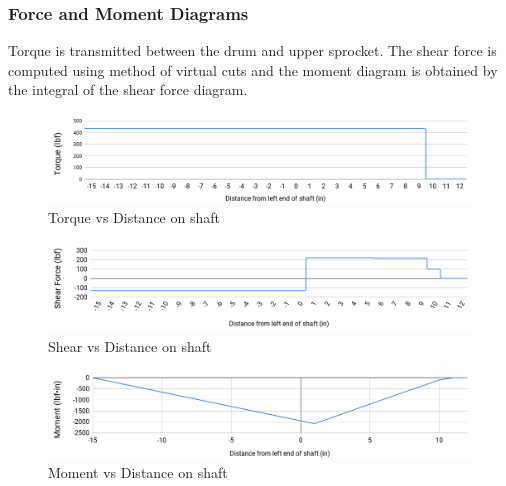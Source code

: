 \documentclass[letterpaper,12pt]{article}
\begin{document}
\subsubsection{Force and Moment Diagrams}
Torque is transmitted between the drum and upper sprocket. The shear force is computed using method of virtual cuts and the moment diagram is obtained by the integral of the shear force diagram. 


\begin{figure}[!h]
\centering
    \includegraphics[width=\linewidth]{A3/torque_wide.png}
    \caption{Torque vs Distance on shaft}
\end{figure}
\vspace{-5mm}
\begin{figure}[!h]
\centering
    \includegraphics[width=\linewidth]{A3/shear_wide.png}
    \caption{Shear vs Distance on shaft}
\end{figure}
\vspace{-5mm}
\begin{figure}[!h]
\centering
    \includegraphics[width=\linewidth]{A3/moment_wide.png}
     \caption{Moment vs Distance on shaft}
\end{figure}
\end{document}
